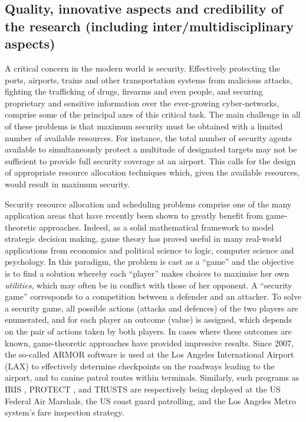 
\subsection{Quality, innovative aspects and credibility of the research (including inter/multidisciplinary aspects)}
\label{sec:quality}

A critical concern in the modern world is security. Effectively protecting the ports, airports, trains and other transportation systems from malicious attacks, fighting the trafficking of drugs, firearms and even people, and securing proprietary and sensitive information over the ever-growing cyber-networks, comprise some of the principal axes of this critical task. The main challenge in all of these problems is that maximum security must be obtained with a limited number of available resources. For instance, the total number of security agents available to simultaneously protect a multitude of designated targets may not be sufficient to provide full security coverage at an airport. This calls for the design of appropriate resource allocation techniques which, given the available resources, would result in maximum security. %
 
Security resource allocation and scheduling problems comprise one of the many application areas that have recently been shown to greatly benefit from game-theoretic approaches. Indeed, as a solid mathematical framework to model strategic decision making, game theory has proved useful in many real-world applications from economics and political science to logic, computer science and psychology. In this paradigm, the problem is cast as a ``game'' and the objective is to find a solution whereby each ``player'' makes choices to maximise her own \textit{utilities}, which may often be in conflict with those of her opponent. A ``security game'' corresponds to a competition between a defender and an attacker. To solve a security game, all possible actions (attacks and defences) of the two players are enumerated, and for each player an outcome (value) is assigned, which depends on the pair of actions taken by both players. In cases where these outcomes are known, game-theoretic approaches have provided impressive results. Since 2007, the so-called ARMOR software \cite{pita2008deployed} is used at the Los Angeles International Airport (LAX) to effectively determine checkpoints on the roadways leading to the airport, and to canine patrol routes within terminals. Similarly, such programs as IRIS \cite{tsai2009iris}, PROTECT \cite{shieh2012protect}, and TRUSTS \cite{yin2012trusts} are respectively being deployed at the US Federal Air Marshals, the US coast guard patrolling, and the Los Angeles Metro system's fare inspection strategy. 

